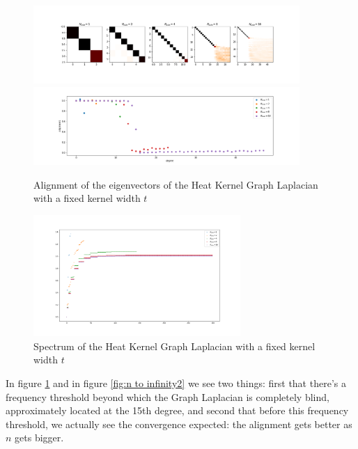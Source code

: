 \begin{figure}[h!]
	\label{fig:n to infinity1}
	\centering
	\includegraphics[width=0.9\textwidth]{../codes/02.HeatKernelGraphLaplacian/HEALPix/06_figures/n.png}
	\includegraphics[width=0.9\textwidth]{../codes/02.HeatKernelGraphLaplacian/HEALPix/06_figures/n_diagonal.png}	
	\caption{Alignment of the eigenvectors of the Heat Kernel Graph Laplacian with a fixed kernel width $t$}
	
\end{figure}
\begin{figure}[h!]
	\label{fig:n to infinity3}
	\centering
	\includegraphics[width=0.7\textwidth]{../codes/02.HeatKernelGraphLaplacian/HEALPix/06_figures/n_eigenvalues.png}	
	\caption{Spectrum of the Heat Kernel Graph Laplacian with a fixed kernel width $t$}
\end{figure}

In figure \ref{fig:n to infinity1} and in figure \ref{fig:n to infinity2} we see two things: first that there's a frequency threshold beyond which the Graph Laplacian is completely blind, approximately located at the 15th degree, and second that before this frequency threshold, we actually see the convergence expected: the alignment gets better as $n$ gets bigger.

